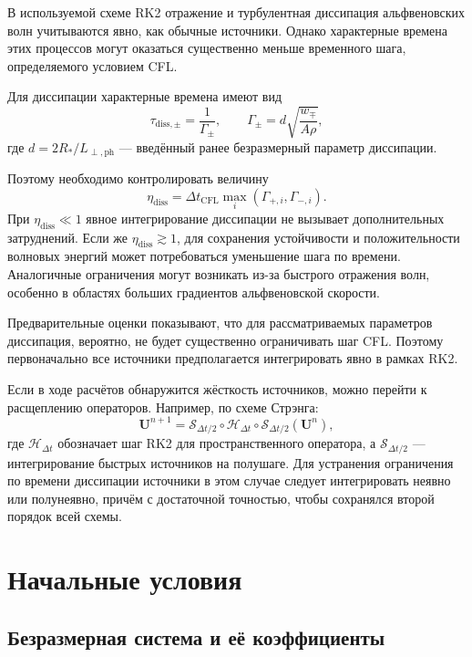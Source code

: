 \documentclass[11pt,a4paper]{article}
\newcommand{\ph}{\mathrm{ph}}
\providecommand{\U}{}
\renewcommand{\U}{\bm U}
\begin{document}
В используемой схеме RK2 отражение и турбулентная диссипация
альфвеновских волн учитываются явно, как обычные источники.
Однако характерные времена этих процессов могут оказаться
существенно меньше временного шага, определяемого условием CFL.

Для диссипации характерные времена имеют вид
\[
\tau_{\mathrm{diss},\pm}=\frac{1}{\Gamma_\pm},
\qquad
\Gamma_\pm=d\sqrt{\frac{w_\mp}{A\rho}},
\]
где $d=2R_*/L_{\perp,\ph}$ --- введённый ранее
безразмерный параметр диссипации.

Поэтому необходимо контролировать величину
\[
\eta_{\mathrm{diss}}
=
\Delta t_{\mathrm{CFL}}
\max_i\left(\Gamma_{+,i},\Gamma_{-,i}\right).
\]
При $\eta_{\mathrm{diss}}\ll1$ явное интегрирование
диссипации не вызывает дополнительных затруднений.
Если же $\eta_{\mathrm{diss}}\gtrsim1$,
для сохранения устойчивости и положительности волновых
энергий может потребоваться уменьшение шага по времени.
Аналогичные ограничения могут возникать из-за быстрого
отражения волн, особенно в областях больших градиентов
альфвеновской скорости.

Предварительные оценки показывают, что для рассматриваемых
параметров диссипация, вероятно, не будет существенно
ограничивать шаг CFL. Поэтому первоначально все источники
предполагается интегрировать явно в рамках RK2.

Если в ходе расчётов обнаружится жёсткость источников,
можно перейти к расщеплению операторов. Например,
по схеме Стрэнга:
\[
\boxed{
\U^{n+1}
=
\mathcal S_{\Delta t/2}
\circ
\mathcal H_{\Delta t}
\circ
\mathcal S_{\Delta t/2}
(\U^n),
}
\]
где $\mathcal H_{\Delta t}$ обозначает шаг RK2
для пространственного оператора,
а $\mathcal S_{\Delta t/2}$ --- интегрирование
быстрых источников на полушаге.
Для устранения ограничения по времени диссипации
источники в этом случае следует интегрировать
неявно или полунеявно, причём с достаточной точностью,
чтобы сохранялся второй порядок всей схемы.


\section{Начальные условия}
\label{sec:initial_conditions}

\subsection{Безразмерная система и её коэффициенты}
\end{document}
